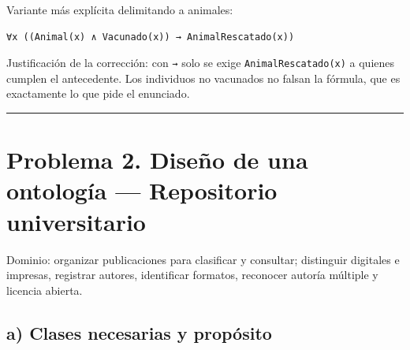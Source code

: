 Variante más explícita delimitando a animales:

\begin{verbatim}
∀x ((Animal(x) ∧ Vacunado(x)) → AnimalRescatado(x))
\end{verbatim}

Justificación de la corrección: con \texttt{→} solo se exige
\texttt{AnimalRescatado(x)} a quienes cumplen el antecedente. Los
individuos no vacunados no falsan la fórmula, que es exactamente lo que
pide el enunciado.

\begin{center}\rule{0.5\linewidth}{0.5pt}\end{center}

\section{Problema 2. Diseño de una ontología --- Repositorio
universitario}\label{problema-2.-diseuxf1o-de-una-ontologuxeda-repositorio-universitario}

Dominio: organizar publicaciones para clasificar y consultar; distinguir
digitales e impresas, registrar autores, identificar formatos, reconocer
autoría múltiple y licencia abierta.

\subsection{a) Clases necesarias y
propósito}\label{a-clases-necesarias-y-propuxf3sito}

